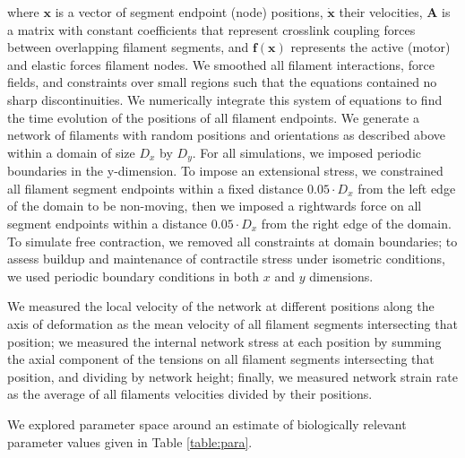 \documentclass[10pt,letterpaper]{article}
\begin{document}
where $\mathbf{x}$ is a vector of segment endpoint (node) positions, $\mathbf{\dot{x}}$ their velocities, $\mathbf{A }$ is a matrix with constant coefficients that represent crosslink coupling forces between overlapping filament segments, and $\mathbf{f(x)}$ represents the active (motor) and elastic forces filament nodes. We smoothed all filament interactions, force fields, and constraints over small regions such that the equations contained no sharp discontinuities. We numerically integrate this system of equations to find the time evolution of the positions of all filament endpoints. We generate a network of filaments with random positions and orientations as described above within a domain of size $D_x$ by $D_y$.  For all simulations, we imposed periodic boundaries in the y-dimension. To impose an extensional stress, we constrained all filament segment endpoints within a fixed distance $0.05\cdot D_x$ from the left edge of the domain to be non-moving, then we imposed a rightwards force on all segment endpoints within a distance $0.05\cdot D_x$ from the right edge of the domain.   To simulate free contraction, we removed all constraints at domain boundaries; to assess buildup and maintenance of contractile stress under isometric conditions, we used periodic boundary conditions in both $x$ and $y$ dimensions.

We measured the local velocity of the network at different positions along the axis of deformation as the mean velocity of all filament segments intersecting that position; we measured the internal network stress at each position by summing the axial component of the tensions on all filament segments intersecting that position, and dividing by network height; finally, we measured network strain rate as the average of all filaments velocities divided by their positions.

We explored parameter space around an estimate of biologically relevant parameter values given in Table \ref{table:para}. 
\end{document}
